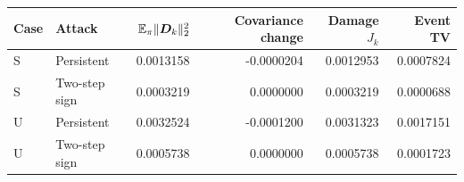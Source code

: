\begin{ecusttable}
\centering\small
{}
\label{tab:vector-damage}
\begin{tabular}{llrrrr}
\toprule
Case & Attack & $\mathbb E_\pi\|{\bm{D}}_k\|_2^2$ & Covariance change & Damage $J_k$ & Event TV\\
\midrule
S & Persistent & 0.0013158 & -0.0000204 & 0.0012953 & 0.0007824 \\
S & Two-step sign & 0.0003219 & 0.0000000 & 0.0003219 & 0.0000688 \\
U & Persistent & 0.0032524 & -0.0001200 & 0.0031323 & 0.0017151 \\
U & Two-step sign & 0.0005738 & 0.0000000 & 0.0005738 & 0.0001723 \\
\bottomrule
\end{tabular}
\par{}
\end{ecusttable}

